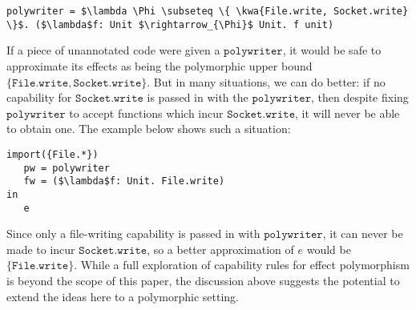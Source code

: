 \documentclass[sigplan,10pt,review]{acmart}\settopmatter{printfolios=true,printccs=false,printacmref=false}
\newcommand{\kwa}[1]{\mathtt{#1}}
\begin{document}
\begin{lstlisting}
polywriter = $\lambda \Phi \subseteq \{ \kwa{File.write, Socket.write} \}$. ($\lambda$f: Unit $\rightarrow_{\Phi}$ Unit. f unit)
\end{lstlisting}

If a piece of unannotated code were given a $\kwa{polywriter}$, it would be safe to approximate its effects as being the polymorphic upper bound $\{ \kwa{File.write, Socket.write} \}$. But in many situations, we can do better: if no capability for $\kwa{Socket.write}$ is passed in with the $\kwa{polywriter}$, then despite fixing $\kwa{polywriter}$ to accept functions which incur $\kwa{Socket.write}$, it will never be able to obtain one. The example below shows such a situation:

\begin{lstlisting}
import({File.*}) 
   pw = polywriter
   fw = ($\lambda$f: Unit. File.write)
in
   e
\end{lstlisting}

Since only a file-writing capability is passed in with $\kwa{polywriter}$, it can never be made to incur $\kwa{Socket.write}$, so a better approximation of $e$ would be $\{ \kwa{File.write} \}$.
While a full exploration of capability rules for effect polymorphism is beyond the scope of this paper, the discussion above suggests the potential to extend the ideas here to a polymorphic setting.
\end{document}
